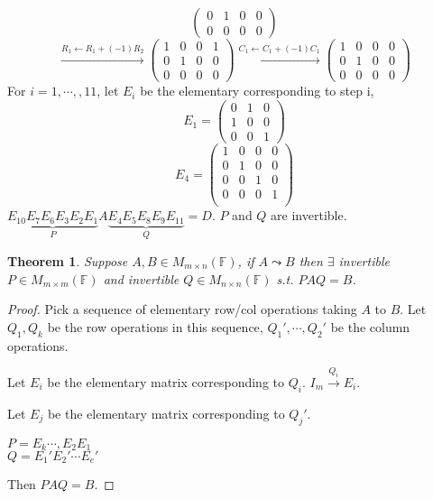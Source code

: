 \documentclass[12pt]{article}
\newtheorem{theorem}{Theorem}[subsection]
\newcommand{\mF}{{\mathbb{F}}}
\begin{document}
{\[\begin{pmatrix}
			0 & 1 & 0 & 0\\
			0 & 0 & 0 & 0
		\end{pmatrix}
	\]
	\[
		\overset{R_1 \leftarrow R_1 + (-1)R_2}{\longrightarrow}
		\begin{pmatrix}
			1 & 0 & 0 & 1\\
			0 & 1 & 0 & 0\\
			0 & 0 & 0 & 0
		\end{pmatrix}
		\overset{C_1 \leftarrow C_1 + (-1)C_1}{\longrightarrow}
		\begin{pmatrix}
			1 & 0 & 0 & 0\\
			0 & 1 & 0 & 0\\
			0 & 0 & 0 & 0
		\end{pmatrix}
	\]
	For $i = 1, \cdots,, 11$, let $E_i$ be the elementary corresponding to step
	i, 
	\[
		E_1 =
		\begin{pmatrix}
			0 & 1 & 0\\
			1 & 0 & 0\\
			0 & 0 & 1
		\end{pmatrix}
	\]
	\[
		E_4 = 
		\begin{pmatrix}
			1 & 0 & 0 & 0	\\
			0 & 1 & 0 & 0	\\
			0 & 0 & 1 & 0	\\
			0 & 0 & 0 & 1	\\
		\end{pmatrix}
	\]
	$\underbrace{E_{10} E_7 E_6 E_3 E_2E_1}_{P} A 
	\underbrace{E_4 E_5E_8 E_9E_{11}}_{Q} = D$.
	$P$ and $Q$ are invertible.\\
	}


	\begin{theorem}
		Suppose $A, B \in M_{m\times n}(\mF)$, if $A \leadsto B$ then $\exists$
		invertible $P \in M_{m\times m} (\mF)$ and invertible 
		$Q \in M_{n \times n} (\mF)$ s.t. $PAQ = B$. 
	\end{theorem}
	\begin{proof}
		Pick a sequence of elementary row/col operations taking $A$ to $B$.
		Let $Q_1, Q_k$ be the row operations in this sequence, $Q_1', \cdots, 
		Q_2'$ be the column operations. 

		Let $E_i$ be the elementary matrix corresponding to $Q_i$.
		$I_m \overset{Q_i}{\longrightarrow} E_i$. 

		Let $E_j$ be the elementary matrix corresponding to $Q_j'$. 

		$P = E_k \cdots, E_2E_1$\\
		$Q = E_1' E_2' \cdots E_e'$

		Then $PAQ = B$. 
	\end{proof}
\end{document}
